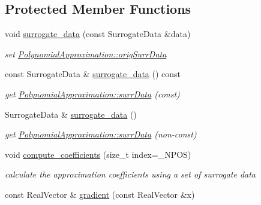 \subsection*{Protected Member Functions}
\begin{DoxyCompactItemize}
\item 
void \hyperlink{classPecos_1_1PolynomialApproximation_aa1896011336650ae7b14965aebd72e1e}{surrogate\+\_\+data} (const Surrogate\+Data \&data)\label{classPecos_1_1PolynomialApproximation_aa1896011336650ae7b14965aebd72e1e}

\begin{DoxyCompactList}\small\item\em set \hyperlink{classPecos_1_1PolynomialApproximation_adea5235bed42287989f0bf6821f9bcf0}{Polynomial\+Approximation\+::orig\+Surr\+Data} \end{DoxyCompactList}\item 
const Surrogate\+Data \& \hyperlink{classPecos_1_1PolynomialApproximation_a8b84d7f8e6de5203f20a47fa66b38ed3}{surrogate\+\_\+data} () const \label{classPecos_1_1PolynomialApproximation_a8b84d7f8e6de5203f20a47fa66b38ed3}

\begin{DoxyCompactList}\small\item\em get \hyperlink{classPecos_1_1PolynomialApproximation_a8e8d62a29dcb5dd55fd03bef1a2b3ea6}{Polynomial\+Approximation\+::surr\+Data} (const) \end{DoxyCompactList}\item 
Surrogate\+Data \& \hyperlink{classPecos_1_1PolynomialApproximation_a0acf94a33f9a66b6823627d75ce566d4}{surrogate\+\_\+data} ()\label{classPecos_1_1PolynomialApproximation_a0acf94a33f9a66b6823627d75ce566d4}

\begin{DoxyCompactList}\small\item\em get \hyperlink{classPecos_1_1PolynomialApproximation_a8e8d62a29dcb5dd55fd03bef1a2b3ea6}{Polynomial\+Approximation\+::surr\+Data} (non-\/const) \end{DoxyCompactList}\item 
void \hyperlink{classPecos_1_1PolynomialApproximation_aef8f0c32bdeff7756a9c614607c03058}{compute\+\_\+coefficients} (size\+\_\+t index=\+\_\+\+N\+P\+OS)\label{classPecos_1_1PolynomialApproximation_aef8f0c32bdeff7756a9c614607c03058}

\begin{DoxyCompactList}\small\item\em calculate the approximation coefficients using a set of surrogate data \end{DoxyCompactList}\item 
const Real\+Vector \& \hyperlink{classPecos_1_1PolynomialApproximation_a42bf374bf23c32c941ee2acae5ad56a4}{gradient} (const Real\+Vector \&x)\label{classPecos_1_1PolynomialApproximation_a42bf374bf23c32c941ee2acae5ad56a4}


\end{DoxyCompactItemize}
